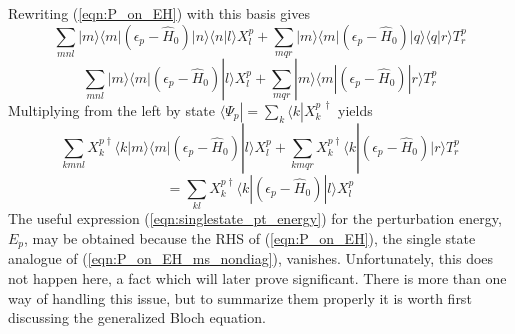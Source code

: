 \documentclass[12pt]{article}
\begin{document}
\noindent Rewriting (\ref{eqn:P_on_EH}) with this basis gives
\begin{equation*}
\sum_{mnl}|m\rangle \langle m | (\epsilon_{p} - \hat{H}_{0})|n\rangle \langle n | l \rangle X_{l}^{p}
+ \sum_{mqr}|m\rangle \langle m | (\epsilon_{p} - \hat{H}_{0})|q\rangle \langle q | r \rangle T_{r}^{p}
\end{equation*}
\begin{equation*}
\sum_{mnl}|m\rangle \langle m | (\epsilon_{p} - \hat{H}_{0})   | l \rangle X_{l}^{p}
+ \sum_{mqr}|m\rangle \langle m | (\epsilon_{p} - \hat{H}_{0}) | r \rangle T_{r}^{p}
\label{eqn:P_on_EH_explicit_bas}
\end{equation*}
Multiplying from the left by state $\langle\Psi_{p}| = \sum_{k}\langle k | X_{k}^{p \ \dagger}$ yields
\begin{equation*}
\sum_{kmnl}X^{p\dagger}_{k}\langle k | m\rangle \langle m | (\epsilon_{p} - \hat{H}_{0})   | l \rangle X_{l}^{p}
+ \sum_{kmqr}X^{p\dagger}_{k}\langle k | (\epsilon_{p} - \hat{H}_{0}) | r \rangle T_{r}^{p}
\end{equation*}
\begin{equation}
=  \sum_{kl}X^{p\dagger}_{k}\langle k | (\epsilon_{p} - \hat{H}_{0}) | l \rangle X_{l}^{p}
\label{eqn:P_on_EH_ms_nondiag}
\end{equation}
The useful expression (\ref{eqn:singlestate_pt_energy}) for the perturbation energy, $E_{p}$, 
may be obtained because the RHS of (\ref{eqn:P_on_EH}), the single state analogue of (\ref{eqn:P_on_EH_ms_nondiag}), vanishes.
Unfortunately, this does not happen here, a fact which will later prove significant.
There is more than one way of handling this issue, but to summarize them properly it is
worth first discussing the generalized Bloch equation.
\end{document}
